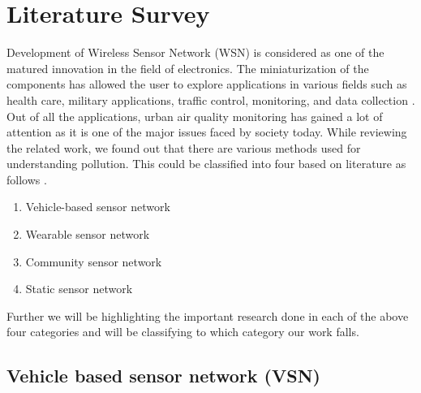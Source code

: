 \chapter{Literature Survey}

Development of Wireless Sensor Network (WSN) is considered as one of the matured innovation in the field of electronics. The miniaturization of the components has allowed the user to explore applications in various fields such as health care, military applications, traffic control, monitoring, and data collection \cite{Khedo2017} \cite{Liu2017}. Out of all the applications, urban air quality monitoring has gained a lot of attention as it is one of the major issues faced by society today. While reviewing the related work, we found out that there are various methods used for understanding pollution. This could be classified into four based on literature as follows \cite{Yi2015} \cite{Pavani2017}.




 
\begin{enumerate}

    \item Vehicle-based sensor network
    \item Wearable sensor network
    \item Community sensor network
    \item Static sensor network

 \end{enumerate} 

 Further we will be highlighting the important research done in each of the above four categories and will be classifying to which category our work falls.

\section{Vehicle based sensor network (VSN)}

